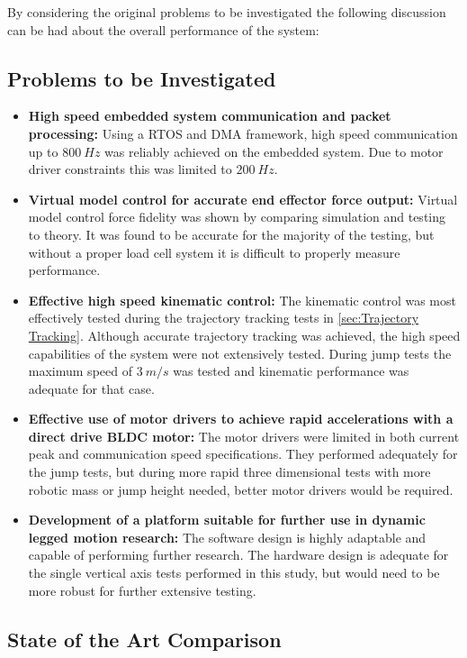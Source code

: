 By considering the original problems to be investigated the following discussion can be had about the overall performance of the system:

\subsection{Problems to be Investigated}
\begin{itemize}
\item \textbf{High speed embedded system communication and packet processing:} Using a RTOS and DMA framework, high speed communication up to $800\ Hz$ was reliably achieved on the embedded system. Due to motor driver constraints this was limited to $200\ Hz$.
\item \textbf{Virtual model control for accurate end effector force output:} Virtual model control force fidelity was shown by comparing simulation and testing to theory. It was found to be accurate for the majority of the testing, but without a proper load cell system it is difficult to properly measure performance.
\item \textbf{Effective high speed kinematic control:} The kinematic control was most effectively tested during the trajectory tracking tests in \cref{sec:Trajectory Tracking}. Although accurate trajectory tracking was achieved, the high speed capabilities of the system were not extensively tested. During jump tests the maximum speed of $3\ m/s$ was tested and kinematic performance was adequate for that case.
\item \textbf{Effective use of motor drivers to achieve rapid accelerations with a direct drive BLDC motor:} The motor drivers were limited in both current peak and communication speed specifications. They performed adequately for the jump tests, but during more rapid three dimensional tests with more robotic mass or jump height needed, better motor drivers would be required.
\item \textbf{Development of a platform suitable for further use in dynamic legged motion research:} The software design is highly adaptable and capable of performing further research. The hardware design is adequate for the single vertical axis tests performed in this study, but would need to be more robust for further extensive testing.
\end{itemize}

\subsection{State of the Art Comparison}

